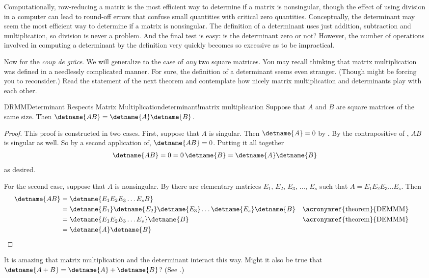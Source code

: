 %
Computationally, row-reducing a matrix is the most efficient way to  determine if a matrix is nonsingular, though the effect of using division in a computer can lead to round-off errors that confuse small quantities with critical zero quantities.  Conceptually, the determinant may seem the most efficient way to determine if a matrix is nonsingular.  The definition of a determinant uses just addition, subtraction and multiplication, so division is never a problem.  And the final test is easy:  is the determinant zero or not?  However, the number of operations involved in computing a determinant by the definition very quickly becomes so excessive as to be impractical.\par
%
Now for the {\it coup de gr\^{a}ce}.  We will generalize  to the case of {\em any} two square matrices.   You may recall thinking that matrix multiplication was defined in a needlessly complicated manner.  For sure, the definition of a determinant seems even stranger.  (Though  might be forcing you to reconsider.)  Read the statement of the next theorem and contemplate how nicely matrix multiplication and determinants play with each other.
%
\begin{theorem}{DRMM}{Determinant Respects Matrix Multiplication}{determinant!matrix multiplication}
Suppose that $A$ and $B$ are square matrices of the same size.  Then $\detname{AB}=\detname{A}\detname{B}$.
\end{theorem}
%
\begin{proof}
This proof is constructed in two cases.  First, suppose that $A$ is singular.  Then $\detname{A}=0$ by .  By the contrapositive of , $AB$ is singular as well.
So by a second application of, $\detname{AB}=0$.  Putting it all together
%
\begin{align*}
\detname{AB}=0=0\,\detname{B}=\detname{A}\detname{B}
\end{align*}
%
as desired.\par
%
For the second case, suppose that $A$ is nonsingular.  By  there are elementary matrices $E_{1},\,E_{2},\,E_{3},\,\dots,\,E_{s}$ such that $A=E_1E_2E_3\dots E_s$.
Then
%
\begin{align*}
\detname{AB}
&=
\detname{E_1E_2E_3\dots E_{s}B}\\
%
&=
\detname{E_1}\detname{E_2}\detname{E_3}\dots\detname{E_s}\detname{B}
&&\text{\acronymref{theorem}{DEMMM}}\\
%
&=
\detname{E_1E_2E_3\dots E_s}\detname{B}
&&\text{\acronymref{theorem}{DEMMM}}\\
%
&=
\detname{A}\detname{B}
%
\end{align*}
%
\end{proof}
%
It is amazing that matrix multiplication and the determinant interact this way.  Might it also be true that $\detname{A+B}=\detname{A}+\detname{B}$?  (See .)
%
%
